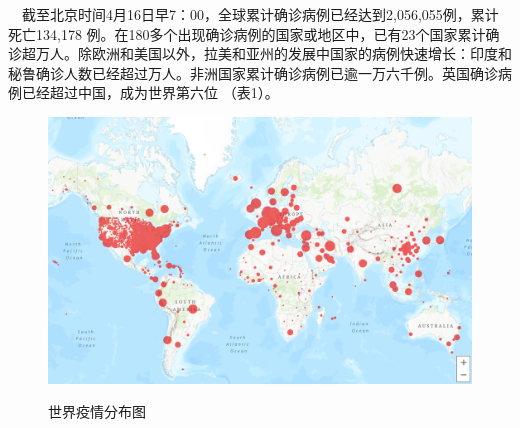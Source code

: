 \documentclass[
]{article}
\begin{document}
\(\quad\)截至北京时间4月16日早7：00，全球累计确诊病例已经达到2,056,055例，累计死亡134,178
例。在180多个出现确诊病例的国家或地区中，已有23个国家累计确诊超万人。除欧洲和美国以外，拉美和亚州的发展中国家的病例快速增长：印度和秘鲁确诊人数已经超过万人。非洲国家累计确诊病例已逾一万六千例。英国确诊病例已经超过中国，成为世界第六位
（表1）。

\begin{figure}[H]
\caption{世界疫情分布图} %
\centering
\includegraphics[]{./input/covid1.png} %
\label{} %
\end{figure}
\end{document}
